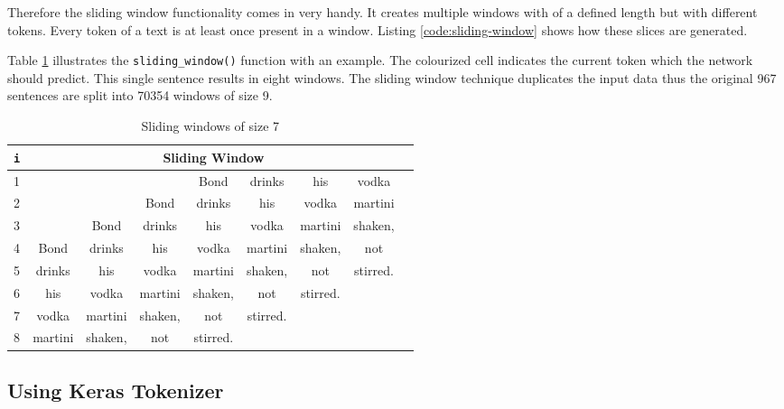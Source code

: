 Therefore the sliding window functionality comes in very handy. It creates multiple windows with of a defined length but with different tokens. Every token of a text is at least once present in a window. Listing \ref{code:sliding-window} shows how these slices are generated.

Table \ref{tbl:sliding-window} illustrates the \verb|sliding_window()| function with an example. The colourized cell indicates the current token which the network should predict. This single sentence results in eight windows. The sliding window technique duplicates the input data thus the original 967 sentences are split into 70354 windows of size 9.

\begin{table}[ht!]
    \centering
    \begin{tabular}{|c|c|c|c|c|c|c|c|c|}
        \hline
        \verb|i| & \multicolumn{7}{c|}{\textbf{Sliding Window}} \\ [0.5ex]
        \hline
        1 &  &  &  & \cellcolor[HTML]{eaeaf2} Bond & drinks & his & vodka \\ [0.5ex]
        \hline
        2 &  &  & Bond & \cellcolor[HTML]{eaeaf2} drinks & his & vodka & martini \\ [0.5ex]
        \hline
        3 &  & Bond & drinks & \cellcolor[HTML]{eaeaf2} his & vodka & martini & shaken, \\ [0.5ex]
        \hline
        4 & Bond & drinks & his & \cellcolor[HTML]{eaeaf2} vodka & martini & shaken, & not \\ [0.5ex]
        \hline
        5 & drinks & his & vodka & \cellcolor[HTML]{eaeaf2} martini & shaken, & not & stirred. \\ [0.5ex]
        \hline
        6 & his & vodka & martini & \cellcolor[HTML]{eaeaf2} shaken, & not & stirred. & \\ [0.5ex]
        \hline
        7 & vodka & martini & shaken, & \cellcolor[HTML]{eaeaf2} not & stirred. &  & \\ [0.5ex]
        \hline
        8 & martini & shaken, & not & \cellcolor[HTML]{eaeaf2} stirred. &  &  & \\ [0.5ex]
        \hline
    \end{tabular}
    \caption{Sliding windows of size 7}
    \label{tbl:sliding-window}
\end{table}

\subsection{Using Keras Tokenizer}
\label{chap:tokenizer}

